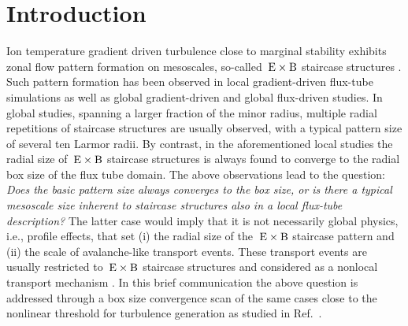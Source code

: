 
\chapter{Introduction}
\label{chap:intro}
\thispagestyle{empty}
\newpage

Ion temperature gradient driven turbulence close to marginal stability exhibits zonal flow pattern formation on mesoscales, so-called $\mathrm{\:E}\times\mathrm{B}$ staircase structures \cite{pradalier2010}.
Such pattern formation has been observed in local gradient-driven flux-tube simulations \cite{peeters2016, weikl2017, rath2021} as well as global gradient-driven \cite{mcmillan2009, villard2013, seo2022} and global flux-driven \cite{pradalier2010, pradalier2015, wang2020, kim2022, kishimoto2023} studies. 
In global studies, spanning a larger fraction of the minor radius, multiple radial repetitions of staircase structures are usually observed, with a typical pattern size of several ten Larmor radii.
By contrast, in the aforementioned local studies the radial size of $\mathrm{\:E}\times\mathrm{B}$ staircase structures is always found to converge to the radial box size of the flux tube domain.
The above observations lead to the question: 
\textit{Does the basic pattern size always converges to the box size, or is there a typical mesoscale size inherent to staircase structures also in a local flux-tube description?}
The latter case would imply that it is not necessarily global physics, i.e., profile effects, that set (i) the radial size of the $\mathrm{\:E}\times\mathrm{B}$ staircase pattern and (ii) the scale of avalanche-like transport events. These transport events are usually restricted to $\mathrm{\:E}\times\mathrm{B}$ staircase structures and considered as a nonlocal transport mechanism \cite{pradalier2010}. 
In this brief communication the above question is addressed through a box size convergence scan of the same cases close to the nonlinear threshold for turbulence generation as studied in Ref.~\cite{peeters2016}.